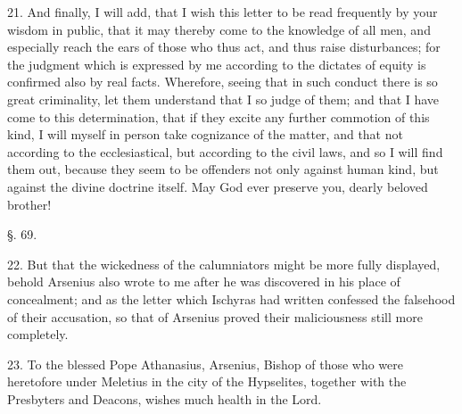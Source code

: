 21. And finally, I will add, that I wish this
letter to be read frequently by your wisdom in public, that it may
thereby come to the knowledge of all men, and especially reach the
ears of those who thus act, and thus raise disturbances; for the
judgment which is expressed by me according to the dictates of equity
is confirmed also by real facts. Wherefore, seeing that in such
conduct there is so great criminality, let them understand that I so
judge of them; and that I have come to this determination, that if
they excite any further commotion of this kind, I will myself in
person take cognizance of the matter, and that not according to the
ecclesiastical, but according to the civil laws, and so I will find
them out, because they seem to be offenders not only against human
kind, but against the divine doctrine itself. May God ever preserve
you, dearly beloved brother!

§. 69.

22. But that the wickedness of the calumniators
might be more fully displayed, behold Arsenius also wrote to me after
he was discovered in his place of concealment; and as the letter which
Ischyras had written confessed the falsehood of their accusation, so
that of Arsenius proved their maliciousness still more completely.

23. To the blessed Pope Athanasius, Arsenius,
Bishop of those who were heretofore under Meletius in the city of the
Hypselites, together with the Presbyters and Deacons, wishes much
health in the Lord.

